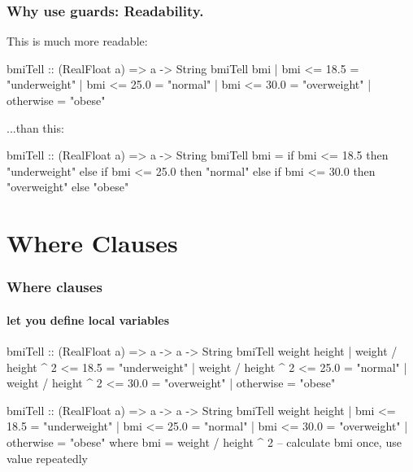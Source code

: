 \documentclass{beamer}
\newenvironment{codeblock}[1][.8]{%
\begin{columns}
\begin{column}{#1\linewidth}
\begin{exampleblock}{}}{%
\end{exampleblock}
\end{column}
\end{columns}}
\begin{document}
\begin{frame}[fragile]
\frametitle{Why use guards: Readability.}

This is much more readable:
\begin{hcode}
bmiTell :: (RealFloat a) => a -> String  
bmiTell bmi  
    | bmi <= 18.5 = "underweight"  
    | bmi <= 25.0 = "normal"  
    | bmi <= 30.0 = "overweight"  
    | otherwise   = "obese"
\end{hcode}
\vfill
\pause
...than this:
\begin{hcode}
bmiTell :: (RealFloat a) => a -> String  
bmiTell bmi = if bmi <= 18.5
               then "underweight"
                else if bmi <= 25.0
                      then "normal"  
                else if bmi <= 30.0
                      then "overweight"
                else
                      "obese"  
\end{hcode}



\end{frame}


\section{Where Clauses}


\begin{frame}[fragile]
\frametitle{Where clauses}
\framesubtitle{let you define local variables}

\begin{hcode}
bmiTell :: (RealFloat a) => a -> a -> String  
bmiTell weight height  
    | weight / height ^ 2 <= 18.5 = "underweight"  
    | weight / height ^ 2 <= 25.0 = "normal"  
    | weight / height ^ 2 <= 30.0 = "overweight"  
    | otherwise                   = "obese"
\end{hcode}
\pause

\begin{hcode}
bmiTell :: (RealFloat a) => a -> a -> String  
bmiTell weight height  
    | bmi <= 18.5 = "underweight"  
    | bmi <= 25.0 = "normal"  
    | bmi <= 30.0 = "overweight"  
    | otherwise   = "obese"
  where
     bmi = weight / height ^ 2
     -- calculate bmi once, use value repeatedly
\end{hcode}

\end{frame}
\end{document}
